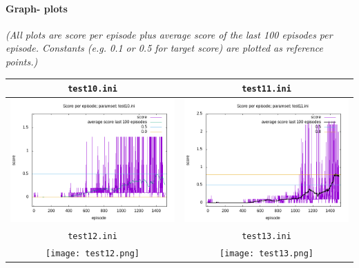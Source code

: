 \documentclass[a4paper]{article}
\begin{document}
\paragraph{Graph- plots}

\textit{(All plots are score per episode plus average score of the last 100 episodes per episode.
Constants (e.g. 0.1 or 0.5 for target score) are plotted as reference points.)}
\\
\begin{tabular}{ |c|c| }
  \hline
  \texttt{test10.ini} & \texttt{test11.ini} \\
  \hline
  \includegraphics[scale=0.35]{test10.png} & \includegraphics[scale=0.35]{test11.png} \\
  \hline
  \texttt{test12.ini} & \texttt{test13.ini} \\
  \hline
  \texttt{[image: test12.png]} & \texttt{[image: test13.png]} \\
  \hline
\end{tabular}
\end{document}
